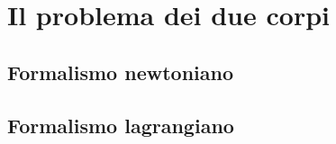 \chapter{Il problema dei due corpi}
\label{chap:due-corpi}

\section{Formalismo newtoniano}
\label{sec:formalismo-newton}

\section{Formalismo lagrangiano}
\label{sec:formalismo-lagrange}

